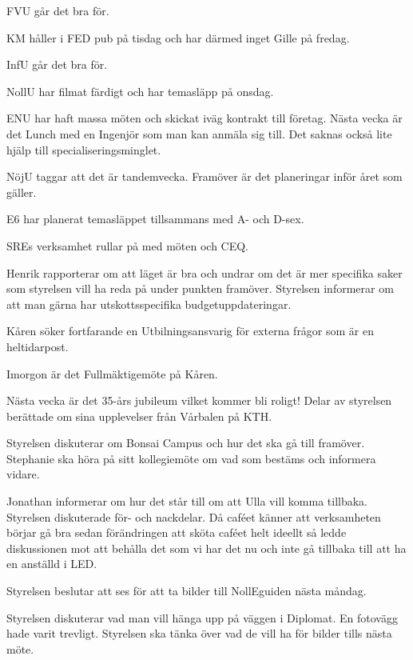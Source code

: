 \documentclass[10pt]{article}
\begin{document}
\begin{paragrafer}
\begin{paragrafer}
FVU går det bra för.

KM håller i FED pub på tisdag och har därmed inget Gille på fredag.

InfU går det bra för.

NollU har filmat färdigt och har temasläpp på onsdag.

ENU har haft massa möten och skickat iväg kontrakt till företag. Nästa vecka är det Lunch med en Ingenjör som man kan anmäla sig till. Det saknas också lite hjälp till specialiseringsminglet.

NöjU taggar att det är tandemvecka. Framöver är det planeringar inför året som gäller.

E6 har planerat temasläppet tillsammans med A- och D-sex.

SREs verksamhet rullar på med möten och CEQ.

Henrik rapporterar om att läget är bra och undrar om det är mer specifika saker som styrelsen vill ha reda på under punkten framöver. Styrelsen informerar om att man gärna har utskottsspecifika budgetuppdateringar.

Kåren söker fortfarande en Utbilningsansvarig för externa frågor som är en heltidarpost.

Imorgon är det Fullmäktigemöte på Kåren.

Nästa vecka är det 35-års jubileum vilket kommer bli roligt!
Delar av styrelsen berättade om sina upplevelser från Vårbalen på KTH.

\end{paragrafer}

Styrelsen diskuterar om Bonsai Campus och hur det ska gå till framöver. Stephanie ska höra på sitt kollegiemöte om vad som bestäms och informera vidare. 


Jonathan informerar om hur det står till om att Ulla vill komma tillbaka. Styrelsen diskuterade för- och nackdelar. Då caféet känner att verksamheten börjar gå bra sedan förändringen att sköta caféet helt ideellt så ledde diskussionen mot att behålla det som vi har det nu och inte gå tillbaka till att ha en anställd i LED.

Styrelsen beslutar att ses för att ta bilder till NollEguiden nästa måndag.

Styrelsen diskuterar vad man vill hänga upp på väggen i Diplomat. En fotovägg hade varit trevligt. Styrelsen ska tänka över vad de vill ha för bilder tills nästa möte.


\end{paragrafer}
\end{document}
